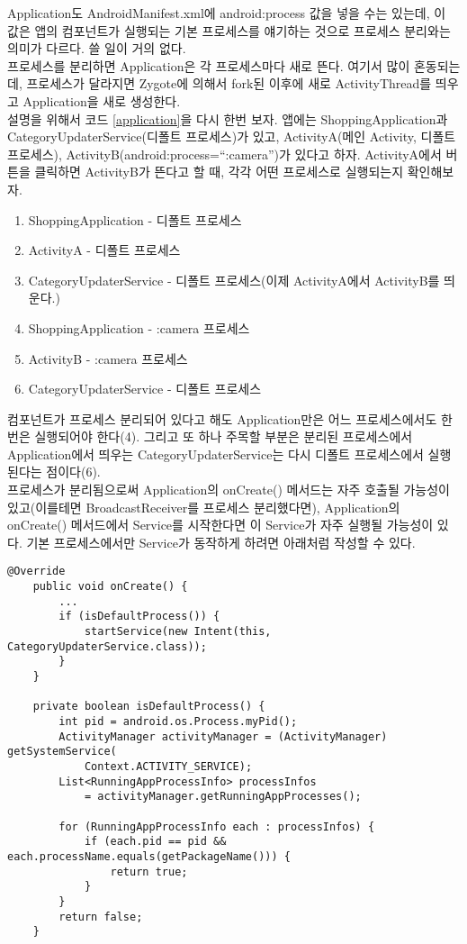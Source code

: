 Application도 AndroidManifest.xml에 android:process 값을 넣을 수는 있는데, 이 값은 앱의 컴포넌트가 실행되는 기본 프로세스를 얘기하는 것으로 프로세스 분리와는 의미가 다르다. 쓸 일이 거의 없다.\\

프로세스를 분리하면 Application은 각 프로세스마다 새로 뜬다. 여기서 많이 혼동되는데, 프로세스가 달라지면 Zygote에 의해서 fork된 이후에 새로 ActivityThread를 띄우고 Application을 새로 생성한다.\\

설명을 위해서 코드 \ref{application}을 다시 한번 보자. 
앱에는 ShoppingApplication과 CategoryUpdaterService(디폴트 프로세스)가 있고, ActivityA(메인 Activity, 디폴트 프로세스), ActivityB(android:process=``:camera'')가 있다고 하자. 
ActivityA에서 버튼을 클릭하면 ActivityB가 뜬다고 할 때, 각각 어떤 프로세스로 실행되는지 확인해보자.

\begin{enumerate}
\item ShoppingApplication - 디폴트 프로세스
\item ActivityA - 디폴트 프로세스
\item CategoryUpdaterService - 디폴트 프로세스(이제 ActivityA에서 ActivityB를 띄운다.)
\item ShoppingApplication - :camera 프로세스
\item ActivityB - :camera 프로세스
\item CategoryUpdaterService - 디폴트 프로세스
\end{enumerate}

컴포넌트가 프로세스 분리되어 있다고 해도 Application만은 어느 프로세스에서도 한번은 실행되어야 한다(4).
그리고 또 하나 주목할 부분은 분리된 프로세스에서 Application에서 띄우는 CategoryUpdaterService는 다시 디폴트 프로세스에서 실행된다는 점이다(6).\\

프로세스가 분리됨으로써 Application의 onCreate() 메서드는 자주 호출될 가능성이 있고(이를테면 BroadcastReceiver를 프로세스 분리했다면), Application의 onCreate() 메서드에서 Service를 시작한다면 이 Service가 자주 실행될 가능성이 있다.
기본 프로세스에서만 Service가 동작하게 하려면 아래처럼 작성할 수 있다.

\begin{lstlisting}[frame=single] 
	@Override
	public void onCreate() {
		...
		if (isDefaultProcess()) {
			startService(new Intent(this, CategoryUpdaterService.class));
		}
	}
	
	private boolean isDefaultProcess() {
		int pid = android.os.Process.myPid();
        ActivityManager activityManager = (ActivityManager) getSystemService(
        	Context.ACTIVITY_SERVICE);                      
        List<RunningAppProcessInfo> processInfos 
        	= activityManager.getRunningAppProcesses();     

        for (RunningAppProcessInfo each : processInfos) {                          
            if (each.pid == pid && each.processName.equals(getPackageName())) {                              
                return true;
            }                         
        }
        return false;
    }
\end{lstlisting}

